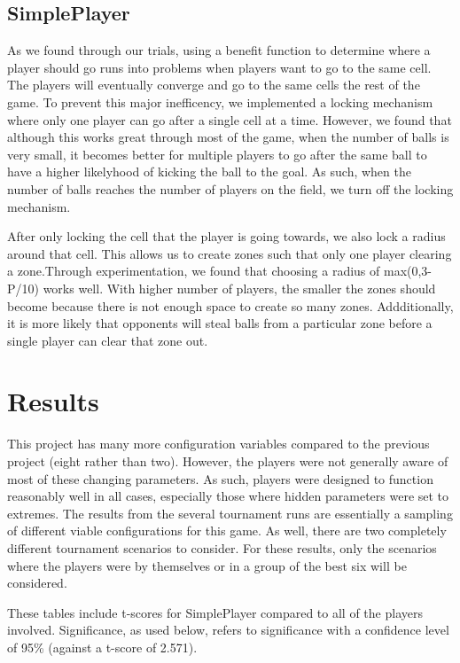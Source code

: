\documentclass[
10pt, %
letterpaper, %
oneside, %
headinclude,footinclude, %
english
]{article}
\begin{document}
\subsection{SimplePlayer}
As we found through our trials, using a benefit function to determine where a player should go runs into problems when players want to go to the same cell. The players will eventually converge and go to the same cells the rest of the game. To prevent this major inefficency, we implemented a locking mechanism where only one player can go after a single cell at a time. However, we found that although this works great through most of the game, when the number of balls is very small, it becomes better for multiple players to go after the same ball to have a higher likelyhood of kicking the ball to the goal. As such, when the number of balls reaches the number of players on the field, we turn off the locking mechanism.

After only locking the cell that the player is going towards, we also lock a radius around that cell. This allows us to create zones such that only one player clearing a zone.Through experimentation, we found that choosing a radius of max(0,3-P/10) works well. With higher number of players, the smaller the zones should become because there is not enough space to create so many zones. Addditionally, it is more likely that opponents will steal balls from a particular zone before a single player can clear that zone out.

\section{Results}
This project has many more configuration variables compared to the previous project (eight rather than two). However, the players were not generally aware of most of these changing parameters. As such, players were designed to function reasonably well in all cases, especially those where hidden parameters were set to extremes. The results from the several tournament runs are essentially a sampling of different viable configurations for this game. As well, there are two completely different tournament scenarios to consider. For these results, only the scenarios where the players were by themselves or in a group of the best six will be considered.  

These tables include t-scores for SimplePlayer compared to all of the players involved. Significance, as used below, refers to significance with a confidence level of 95\% (against a t-score of 2.571).
\end{document}
